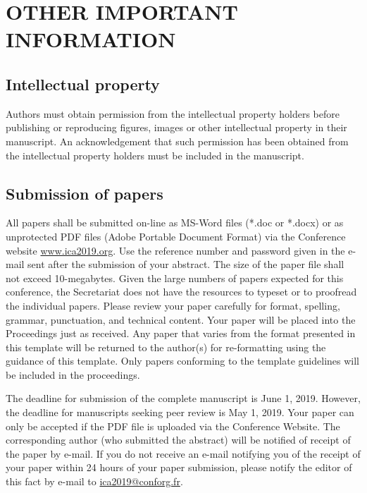 \section{\uppercase{Other important information}}

\subsection{Intellectual property}

Authors must obtain permission from the intellectual property holders before publishing or reproducing figures, images or other intellectual property in their manuscript. An acknowledgement that such permission has been obtained from the intellectual property holders must be included in the manuscript.

\subsection{Submission of papers}

All papers shall be submitted on-line as MS-Word files (*.doc or *.docx) or as unprotected PDF files (Adobe Portable Document Format) via the Conference website \href{www.ica2019.org}{www.ica2019.org}. Use the reference number and password given in the e-mail sent after the submission of your abstract. The size of the paper file shall not exceed 10-megabytes. Given the large numbers of papers expected for this conference, the Secretariat does not have the resources to typeset or to proofread the individual papers. Please review your paper carefully for format, spelling, grammar, punctuation, and technical content. Your paper will be placed into the Proceedings just as received. Any paper that varies from the format presented in this template will be returned to the author(s) for re-formatting using the guidance of this template. Only papers conforming to the template guidelines will be included in the proceedings.

The deadline for submission of the complete manuscript is June 1, 2019. However, the deadline for manuscripts seeking peer review is May 1, 2019. Your paper can only be accepted if the PDF file is uploaded via the Conference Website. The corresponding author (who submitted the abstract) will be notified of receipt of the paper by e-mail. If you do not receive an e-mail notifying you of the receipt of your paper within 24 hours of your paper submission, please notify the editor of this fact by e-mail to \href{ica2019@conforg.fr}{ica2019@conforg.fr}.

